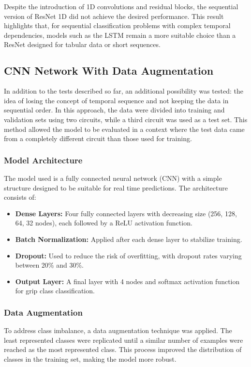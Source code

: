 \documentclass[a4paper,final,12pt]{report}
\begin{document}
Despite the introduction of 1D convolutions and residual blocks, the sequential version of ResNet 1D did not achieve the desired performance. This result highlights that, for sequential classification problems with complex temporal dependencies, models such as the LSTM remain a more suitable choice than a ResNet designed for tabular data or short sequences.

\subsection{CNN Network With Data Augmentation}
In addition to the tests described so far, an additional possibility was tested: the idea of losing the concept of temporal sequence and not keeping the data in sequential order. In this approach, the data were divided into training and validation sets using two circuits, while a third circuit was used as a test set. This method allowed the model to be evaluated in a context where the test data came from a completely different circuit than those used for training.

\subsubsection{Model Architecture}
The model used is a fully connected neural network (CNN) with a simple structure designed to be suitable for real time predictions. The architecture consists of:
\begin{itemize}
    \item \textbf{Dense Layers:} Four fully connected layers with decreasing size (256, 128, 64, 32 nodes), each followed by a ReLU activation function.
    \item \textbf{Batch Normalization:} Applied after each dense layer to stabilize training.
    \item \textbf{Dropout:} Used to reduce the risk of overfitting, with dropout rates varying between 20\% and 30\%.
    \item \textbf{Output Layer:} A final layer with 4 nodes and softmax activation function for grip class classification.
\end{itemize}

\subsubsection{Data Augmentation}
To address class imbalance, a data augmentation technique was applied. The least represented classes were replicated until a similar number of examples were reached as the most represented class. This process improved the distribution of classes in the training set, making the model more robust.
\end{document}
